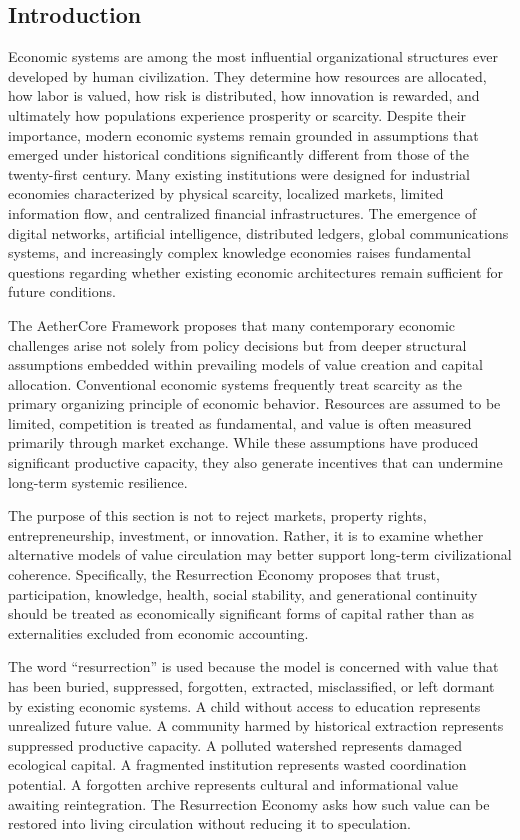 \documentclass[12pt]{article}
\begin{document}
\subsection{Introduction}

Economic systems are among the most influential organizational structures ever developed by human civilization. They determine how resources are allocated, how labor is valued, how risk is distributed, how innovation is rewarded, and ultimately how populations experience prosperity or scarcity. Despite their importance, modern economic systems remain grounded in assumptions that emerged under historical conditions significantly different from those of the twenty-first century. Many existing institutions were designed for industrial economies characterized by physical scarcity, localized markets, limited information flow, and centralized financial infrastructures. The emergence of digital networks, artificial intelligence, distributed ledgers, global communications systems, and increasingly complex knowledge economies raises fundamental questions regarding whether existing economic architectures remain sufficient for future conditions.

The AetherCore Framework proposes that many contemporary economic challenges arise not solely from policy decisions but from deeper structural assumptions embedded within prevailing models of value creation and capital allocation. Conventional economic systems frequently treat scarcity as the primary organizing principle of economic behavior. Resources are assumed to be limited, competition is treated as fundamental, and value is often measured primarily through market exchange. While these assumptions have produced significant productive capacity, they also generate incentives that can undermine long-term systemic resilience.

The purpose of this section is not to reject markets, property rights, entrepreneurship, investment, or innovation. Rather, it is to examine whether alternative models of value circulation may better support long-term civilizational coherence. Specifically, the Resurrection Economy proposes that trust, participation, knowledge, health, social stability, and generational continuity should be treated as economically significant forms of capital rather than as externalities excluded from economic accounting.

The word ``resurrection'' is used because the model is concerned with value that has been buried, suppressed, forgotten, extracted, misclassified, or left dormant by existing economic systems. A child without access to education represents unrealized future value. A community harmed by historical extraction represents suppressed productive capacity. A polluted watershed represents damaged ecological capital. A fragmented institution represents wasted coordination potential. A forgotten archive represents cultural and informational value awaiting reintegration. The Resurrection Economy asks how such value can be restored into living circulation without reducing it to speculation.
\end{document}
